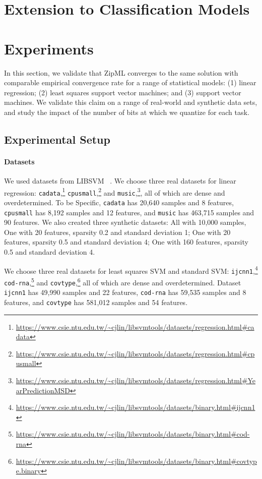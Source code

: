 \documentclass{article}
\begin{document}
\section{Extension to Classification Models}



\section{Experiments} \label{sec:exp}

In this section, we validate that ZipML 
converges to the same solution with comparable
empirical convergence rate for a range of
statistical models: (1) linear regression;
(2) least squares support vector machines;
and (3) support vector machines.
We validate this claim on a range of real-world
and synthetic data sets, and study the impact
of the number of bits at which we quantize for each task.

\subsection{Experimental Setup}

\paragraph{Datasets} 

We used datasets from LIBSVM ~\cite{LIBSVM}.
We choose three real datasets for linear regression: \texttt{cadata},\footnote{\url{https://www.csie.ntu.edu.tw/~cjlin/libsvmtools/datasets/regression.html#cadata}}
\texttt{cpusmall},\footnote{\url{https://www.csie.ntu.edu.tw/~cjlin/libsvmtools/datasets/regression.html#cpusmall}} 
and \texttt{music},\footnote{\url{https://www.csie.ntu.edu.tw/~cjlin/libsvmtools/datasets/regression.html#YearPredictionMSD}}, all of which are dense and overdetermined. To be Specific, \texttt{cadata} has 20,640 samples and 8 features, \texttt{cpusmall} has 8,192 samples and 12 features, and \texttt{music} has 463,715 samples and 90 features.
We also created three synthetic datasets: All with 10,000 samples, One with 20 features, sparsity 0.2 and standard deviation 1; One with 20 features, sparsity 0.5 and standard deviation 4; One with 160 features, sparsity 0.5 and standard deviation 4.

We choose three real datasets for least squares SVM and standard SVM: \texttt{ijcnn1},\footnote{\url{https://www.csie.ntu.edu.tw/~cjlin/libsvmtools/datasets/binary.html#ijcnn1}} \texttt{cod-rna},\footnote{\url{https://www.csie.ntu.edu.tw/~cjlin/libsvmtools/datasets/binary.html#cod-rna}} and \texttt{covtype},\footnote{\url{https://www.csie.ntu.edu.tw/~cjlin/libsvmtools/datasets/binary.html#covtype.binary}} all of which are dense and overdetermined. Dataset \texttt{ijcnn1} has 49,990 samples and 22 features, \texttt{cod-rna} has 59,535 samples and 8 features, and \texttt{covtype} has 581,012 samples and 54 features.
\end{document}
